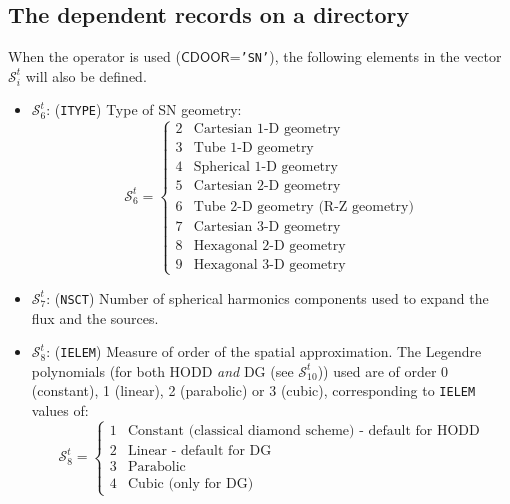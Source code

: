 \subsection{The  dependent records on a  directory}\label{sect:sntrackingdir}

When the  operator is used ($\mathsf{CDOOR}$={\tt 'SN'}), the following elements in the vector
$\mathcal{S}^{t}_{i}$ will also be defined.

\begin{itemize}
\item $\mathcal{S}^{t}_{6}$: ({\tt ITYPE}) Type of SN geometry:
\begin{displaymath}
\mathcal{S}^{t}_{6} = \left\{
\begin{array}{rl}
 2 & \textrm{Cartesian 1-D geometry} \\
 3 & \textrm{Tube 1-D geometry} \\
 4 & \textrm{Spherical 1-D geometry} \\
 5 & \textrm{Cartesian 2-D geometry} \\
 6 & \textrm{Tube 2-D geometry (R-Z geometry)} \\
 7 & \textrm{Cartesian 3-D geometry} \\
 8 & \textrm{Hexagonal 2-D geometry} \\
 9 & \textrm{Hexagonal 3-D geometry}
\end{array} \right.
\end{displaymath}

\item $\mathcal{S}^{t}_{7}$: ({\tt NSCT}) Number of spherical harmonics components used to expand the flux and the sources.

\item $\mathcal{S}^{t}_{8}$: ({\tt IELEM}) Measure of order of the spatial approximation. The Legendre polynomials (for both HODD \emph{and} DG (see $\mathcal{S}^{t}_{10}$)) used are of order 0 (constant), 1 (linear), 2 (parabolic) or 3 (cubic), corresponding to {\tt IELEM} values of:
\begin{displaymath}
\mathcal{S}^{t}_{8} = \left\{
\begin{array}{rl}
 1 & \textrm{Constant (classical diamond scheme) - default for HODD} \\
 2 & \textrm{Linear - default for DG} \\
 3 & \textrm{Parabolic} \\
 4 & \textrm{Cubic (only for DG)}
\end{array} \right.
\end{displaymath}


\end{itemize}
